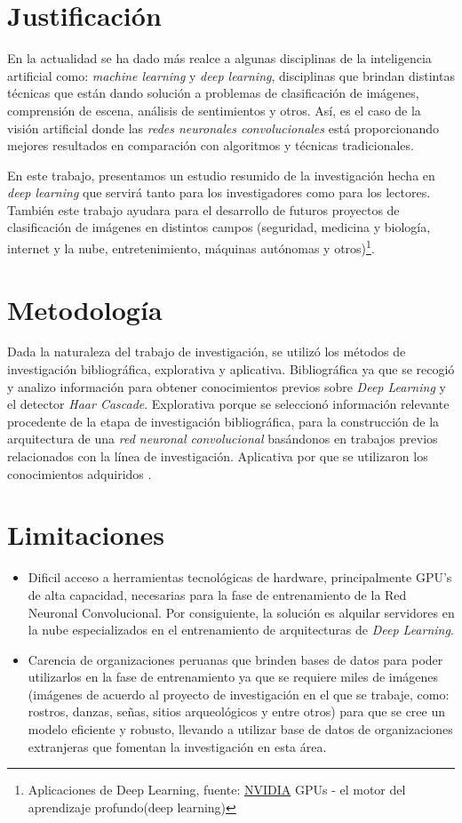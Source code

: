 \section{Justificación}
En la actualidad se ha dado más realce a algunas disciplinas de la inteligencia artificial como: \textit{machine learning} y \textit{deep learning}, disciplinas que brindan distintas técnicas que están dando solución a problemas de clasificación de imágenes, comprensión de escena, análisis de sentimientos y otros. Así, es el caso de la visión artificial donde las \textit{redes neuronales convolucionales} está proporcionando mejores resultados en comparación con algoritmos y técnicas tradicionales.

En este trabajo, presentamos un estudio resumido de la investigación hecha en \textit{deep learning} que servirá tanto para los investigadores como para los lectores. También este trabajo ayudara para el desarrollo de futuros proyectos de clasificación de imágenes en distintos campos (seguridad, medicina y biología, internet y la nube, entretenimiento, máquinas autónomas y otros)\footnote[4]{Aplicaciones de Deep Learning, fuente: \href{https://developer.nvidia.com/deep-learning}{NVIDIA} GPUs - el motor del aprendizaje profundo(deep learning)}.


\section{Metodología}
Dada la naturaleza del trabajo de investigación, se utilizó los métodos de investigación bibliográfica, explorativa y aplicativa. Bibliográfica ya que se recogió y analizo información para obtener conocimientos previos sobre \textit{Deep Learning} y el detector \textit{Haar Cascade}. Explorativa porque se seleccionó información relevante procedente de la etapa de investigación bibliográfica, para la construcción de la arquitectura de una \textit{red neuronal convolucional} basándonos en trabajos previos relacionados con la línea de investigación. Aplicativa por que se utilizaron los conocimientos adquiridos \cite{19sabino1994hacer}\cite{23silva2001metodologia}.


\section{Limitaciones}
\begin{itemize}
\item Dificil acceso a herramientas tecnológicas de hardware, principalmente GPU's de alta capacidad, necesarias para la fase de entrenamiento de la Red Neuronal Convolucional. Por consiguiente, la solución es alquilar servidores en la nube especializados en el entrenamiento de arquitecturas de \textit{Deep Learning}.
\item Carencia de organizaciones peruanas que brinden bases de datos para poder utilizarlos en la fase de entrenamiento ya que se requiere miles de imágenes (imágenes de acuerdo al proyecto de investigación en el que se trabaje, como: rostros, danzas, señas, sitios arqueológicos y entre otros) para que se cree un modelo eficiente y robusto, llevando a utilizar base de datos de organizaciones extranjeras que fomentan la investigación en esta área.
\end{itemize}
\newpage
